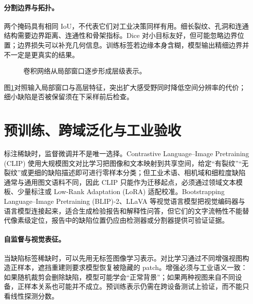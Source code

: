 \paragraph{分割边界与拓扑。}
两个掩码具有相同 IoU，不代表它们对工业决策同样有用。细长裂纹、孔洞和连通结构需要边界距离、连通性和骨架指标。Dice 对小目标友好，但可能忽略边界位置；边界损失可以补充几何信息。训练标签若边缘本身含糊，模型输出精细边界并不一定是更真实的结果。

\begin{figure}[htbp]
\centering
{}
\caption{卷积网络从局部窗口逐步形成层级表示。}
\label{fig:vision-receptive-field}
\end{figure}

图\ref{fig:vision-receptive-field}对照输入局部窗口与高层特征，突出扩大感受野同时降低空间分辨率的代价；细小缺陷是否被保留须在下采样前后检查。
\section{预训练、跨域泛化与工业验收}
标注稀缺时，监督微调并不是唯一选择。Contrastive Language--Image Pretraining (CLIP) 使用大规模图文对比学习把图像和文本映射到共享空间，给定“有裂纹”“无裂纹”或更细的缺陷描述即可进行零样本分类；但工业术语、相机域和细粒度缺陷通常与通用图文语料不同，因此 CLIP 只能作为迁移起点，必须通过领域文本模板、少量标注或 Low-Rank Adaptation (LoRA) 适配校准。Bootstrapping Language--Image Pretraining (BLIP)-2、LLaVA 等视觉语言模型把视觉编码器与语言模型连接起来，适合生成检验报告和解释性问答，但它们的文字流畅性不能替代像素级定位，报告中的缺陷位置仍应由检测器或分割器提供可验证证据。

\paragraph{自监督与视觉表征。}
当缺陷标签稀缺时，可以先用无标签图像学习表示。对比学习通过不同增强视图构造正样本，遮挡重建则要求模型恢复被隐藏的 patch。增强必须与工业语义一致：如果随机裁剪会删除缺陷，模型可能学会“正常背景”；如果两种视图来自不同设备，正样本关系也可能并不成立。预训练表示仍需在跨设备测试上验证，而不能只看线性探测分数。


